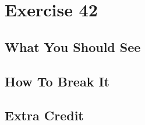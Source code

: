 \chapter{Exercise 42}


\section{What You Should See}


\section{How To Break It}


\section{Extra Credit}



